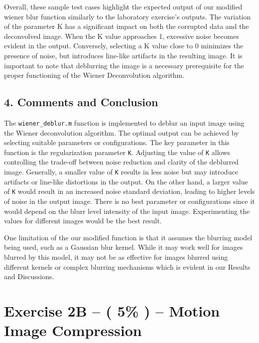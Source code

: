 \documentclass{article}
\begin{document}
	Overall, these sample test cases highlight the expected output of our modified wiener blur function similarly to the laboratory exercise's outputs. The variation of the parameter K has a 
	significant impact on both the corrupted data and the deconvolved image. When the K value approaches 1, excessive noise becomes evident in the output. Conversely, selecting a K value 
	close to 0 minimizes the presence of noise, but introduces line-like artifacts in the resulting image. It is important to note that deblurring the image is a necessary prerequisite for 
	the proper functioning of the Wiener Deconvolution algorithm.

	\clearpage





	\subsection*{4. Comments and Conclusion}
	The {\texttt{wiener\_deblur.m}} function is implemented to deblur an input image using the Wiener deconvolution algorithm. The optimal output can be achieved by selecting suitable parameters or 
	configurations. The key parameter in this function is the regularization parameter {\texttt{K}}. Adjusting the value of {\texttt{K}} allows controlling the trade-off between noise reduction 
	and clarity of the deblurred image. Generally, a smaller value of {\texttt{K}} results in less noise but may introduce artifacts or line-like distortions in the output. On the other hand, 
	a larger value of {\texttt{K}} would result in an increased noise standard deviation, leading to higher levels of noise in the output image. There is no best parameter or configurations since
	it would depend on the blurr level intensity of the input image. Experimenting the values for different images would be the best result.

	One limitation of the our modified function is that it assumes the blurring model being used, such as a Gaussian blur kernel. While it may work well for images blurred by this model, 
	it may not be as effective for images blurred using different kernels or complex blurring mechanisms which is evident in our Results and Discussions. 



	\vspace{0.5cm}
	
	\newpage
	\section*{Exercise 2B –  ( 5\% ) – Motion Image Compression}
	
\end{document}
